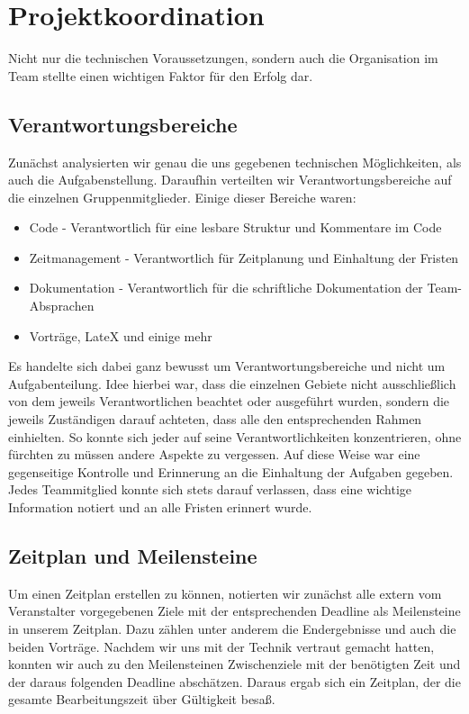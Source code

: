 \section{Projektkoordination}
\label{sec:projektkoordination}

Nicht nur die technischen Voraussetzungen, sondern auch die Organisation im Team stellte einen wichtigen Faktor für den Erfolg dar.

\subsection{Verantwortungsbereiche}
Zunächst analysierten wir genau die uns gegebenen technischen Möglichkeiten, als auch die Aufgabenstellung. Daraufhin verteilten wir Verantwortungsbereiche auf die einzelnen Gruppenmitglieder. Einige dieser Bereiche waren:
\begin{itemize}
	\item Code - Verantwortlich für eine lesbare Struktur und Kommentare im Code
	\item Zeitmanagement - Verantwortlich für Zeitplanung und Einhaltung der Fristen
	\item Dokumentation - Verantwortlich für die schriftliche Dokumentation der Team-Absprachen
	\item Vorträge, LateX und einige mehr
\end{itemize}
Es handelte sich dabei ganz bewusst um Verantwortungsbereiche und nicht um Aufgabenteilung. Idee hierbei war, dass die einzelnen Gebiete nicht ausschließlich von dem jeweils Verantwortlichen beachtet oder ausgeführt wurden, sondern die jeweils Zuständigen darauf achteten, dass alle den entsprechenden Rahmen einhielten. So konnte sich jeder auf seine Verantwortlichkeiten konzentrieren, ohne fürchten zu müssen andere Aspekte zu vergessen. Auf diese Weise war eine gegenseitige Kontrolle und Erinnerung an die Einhaltung der Aufgaben gegeben. Jedes Teammitglied konnte sich stets darauf verlassen, dass eine wichtige Information notiert und an alle Fristen erinnert wurde.


\subsection{Zeitplan und Meilensteine}
Um einen Zeitplan erstellen zu können, notierten wir zunächst alle extern vom Veranstalter vorgegebenen Ziele mit der entsprechenden Deadline als Meilensteine in unserem Zeitplan. Dazu zählen unter anderem die Endergebnisse und auch die beiden Vorträge. Nachdem wir uns mit der Technik vertraut gemacht hatten, konnten wir auch zu den Meilensteinen Zwischenziele mit der benötigten Zeit und der daraus folgenden Deadline abschätzen. Daraus ergab sich ein Zeitplan, der die gesamte Bearbeitungszeit über Gültigkeit besaß.
\pagebreak
